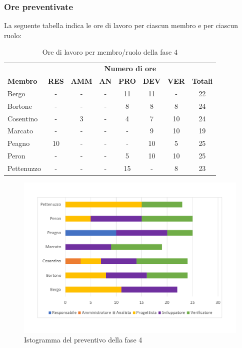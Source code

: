 	\subsubsection{Ore preventivate}
		La seguente tabella indica le ore di lavoro per ciascun membro e per ciascun ruolo:
		\begin{table}[H]
			\centering
			\begin{tabular}{| l | c c c c c c | c |}
				\rowcolor{LightBlue}
				& \multicolumn{7}{c}{\textbf{\color{white}Numero di ore}}	\\
		
				\rowcolor{LightBlue}
				\textbf{\color{white}Membro}
				& \textbf{\color{white}RES}
				& \textbf{\color{white}AMM}
				& \textbf{\color{white}AN}
				& \textbf{\color{white}PRO}
				& \textbf{\color{white}DEV}
				& \textbf{\color{white}VER}
				& \textbf{\color{white}Totali}\\
	
				Bergo      & - & - & - & 11 & 11 & - & 22\\
				Bortone    & - & - & - & 8 & 8 & 8 & 24\\
				Cosentino  & - & 3 & - & 4 & 7 & 10 & 24\\
				Marcato    & - & - & - & - & 9 & 10 & 19\\
				Peagno     & 10 & - & - & - & 10 & 5 & 25\\
				Peron      & - & - & - & 5 & 10 & 10 & 25\\
				Pettenuzzo & - & - & - & 15 & - & 8 & 23\\ \hline
			\end{tabular}
			\caption{Ore di lavoro per membro/ruolo della fase 4}
		\end{table}
		
	\begin{figure}[h]
	\centering
	\includegraphics[scale=0.45]{images/preventivoRA.pdf}
	\caption{Istogramma del preventivo della fase 4}
\end{figure}
		
